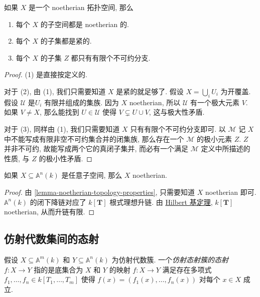 \begin{lemma}
  \label{lemma-noetherian-topology-properties}
  如果 \( X \) 是一个 noetherian 拓扑空间, 那么
  \begin{enumerate}
    \item 每个 \( X \) 的子空间都是 noetherian 的.
    \item 每个 \( X \) 的子集都是紧的.
    \item 每个 \( X \) 的子集 \( Z \) 都只有有限个不可约分支.
  \end{enumerate}
\end{lemma}
\begin{proof}
  (1) 是直接按定义的.

  对于 (2), 由 (1), 我们只需要知道 \( X \) 是紧的就足够了. 假设 \( X = \bigcup_i
  U_i \) 为开覆盖. 假设 \( \mathcal{U} \) 是\( U_i \) 有限并组成的集族. 因为 \(
  X \) noetherian, 所以 \( \mathcal{U} \) 有一个极大元素 \( V \). 如果 \( V \neq
  X \), 那么能找到 \( U \in \mathcal{U} \) 使得 \( V \subsetneq U \cup V \),
  这与极大性矛盾.

  对于 (3), 同样由 (1), 我们只需要知道 \( X \) 只有有限个不可约分支即可. 以 \(
  \mathcal{M} \) 记 \( X \) 中不能写成有限非空不可约集合并的闭集族, 那么存在一个
  \( \mathcal{M} \) 的极小元素 \( Z \). \( Z \) 并非不可约,
  故能写成两个它的真闭子集并, 而必有一个满足 \( \mathcal{M} \)
  定义中所描述的性质, 与 \( Z \) 的极小性矛盾.
\end{proof}

\begin{proposition}
  如果 \( X \subseteq \mathbb{A}^n(k) \) 是任意子空间, 那么 \( X \) noetherian.
\end{proposition}
\begin{proof}
  由 \cref{lemma-noetherian-topology-properties}, 只需要知道 \( X \) noetherian
  即可. \( \mathbb{A}^n(k) \) 的闭下降链对应了 \( k[\mathbf{T}] \) 根式理想升链.
  由 \href{https://en.wikipedia.org/wiki/Hilbert%27s_basis_theorem}{Hilbert
  基定理}, \( k[\mathbf{T}] \) noetherian, 从而升链有限.
\end{proof}


\subsection{仿射代数集间的态射}

假设 \( X \subseteq \mathbb{A}^m(k) \) 和 \( Y \subseteq \mathbb{A}^n(k) \)
为仿射代数簇. 一个\emph{仿射态射簇的态射} \( f: X \to Y \) 指的是底集合为 \( X
\) 和 \( Y \) 的映射 \( f: X \to Y \) 满足存在多项式 \( f_1, \ldots, f_n \in
k[T_1, \ldots, T_m] \) 使得 \( f(x) = (f_1(x), \ldots, f_n(x)) \) 对每个 \( x
\in X \) 成立.


